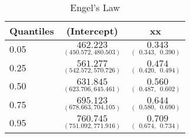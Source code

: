 %
\begin{table}[hptb]
\caption{Engel's Law\label{fit2}}
\begin{center}
\begin{tabular}{|l||c|c|} \hline
\multicolumn{1}{|l||}{Quantiles}&\multicolumn{1}{c|}{(Intercept)}&\multicolumn{1}{c|}{xx}\\ \hline
0.05&$\underset{(450.572,480.503)}{462.223}$&$\underset{(~~0.343,~~0.390)}{~~0.343}$\\ 
0.25&$\underset{(542.572,570.726)}{561.277}$&$\underset{(~~0.420,~~0.494)}{~~0.474}$\\ 
0.50&$\underset{(623.706,645.461)}{631.845}$&$\underset{(~~0.487,~~0.602)}{~~0.560}$\\ 
0.75&$\underset{(678.663,704.105)}{695.123}$&$\underset{(~~0.580,~~0.690)}{~~0.644}$\\ 
0.95&$\underset{(751.092,771.916)}{760.745}$&$\underset{(~~0.674,~~0.734)}{~~0.709}$\\ 
\hline
\end{tabular}
\vspace{3mm}
\end{center}
\end{table}

